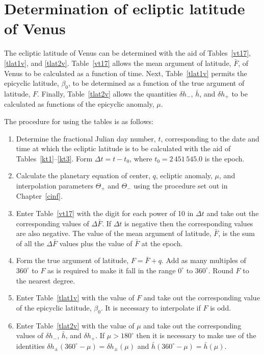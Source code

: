 \section{Determination of ecliptic latitude of Venus}
The ecliptic latitude of Venus can be determined with the aid of Tables~\ref{vt17}, \ref{tlat1v}, and \ref{tlat2v}. Table~\ref{vt17} allows
the mean argument of latitude, $\bar{F}$, of Venus to be calculated as a function of
time. Next, Table~\ref{tlat1v} permits the epicyclic  latitude, $\beta_0$, to
be determined as a function of the true argument of latitude, $F$. Finally, Table~\ref{tlat2v} allows the quantities
$\delta h_-$, $\bar{h}$, and $\delta h_+$ to be calculated as functions of the epicyclic
anomaly, $\mu$. 

The procedure for using the tables is as follows:
\begin{enumerate}

\item Determine the fractional Julian day number, $t$, corresponding to the date and time
at which the ecliptic latitude is to be calculated with the aid of Tables~\ref{kt1}--\ref{kt3}. Form $\Delta t = t-t_0$, where $t_0=2\,451\,545.0$ is the epoch. 

\item Calculate the planetary equation
of center, $q$,  ecliptic anomaly, $\mu$, and 
interpolation parameters $\Theta_+$ and $\Theta_-$ using the
procedure set out in Chapter~\ref{cinf}.

\item Enter Table~\ref{vt17} with the digit for each power of 10
in ${\Delta} t$ and take out the corresponding values of $\Delta\bar{F}$. If $\Delta t$ is negative then the corresponding
values are also negative.
The value of the mean argument of latitude, $\bar{F}$, is the
sum of all the $\Delta\bar{F}$ values plus the value of $\bar{F}$ at the epoch.  

\item Form the true argument of latitude,
$F=\bar{F} + q$. Add as many multiples of $360^\circ$ to $F$ 
as is required to make it fall in the range $0^\circ$ to $360^\circ$.
Round $F$ to the nearest degree.

\item Enter Table~\ref{tlat1v} with the value of $F$ and take out the
corresponding value of the epicyclic latitude, $\beta_0$. It is necessary to interpolate if $F$ is odd.

\item Enter Table~\ref{tlat2v} with the value of $\mu$ and take
out the corresponding values of $\delta h_-$, $\bar{h}$, and
$\delta h_+$. If $\mu > 180^\circ$ then it is necessary to make use
of the identities $\delta h_\pm(360^\circ - \mu) = \delta h_\pm(\mu)$
and $\bar{h}(360^\circ - \mu) = \bar{h}(\mu)$.


\end{enumerate}
